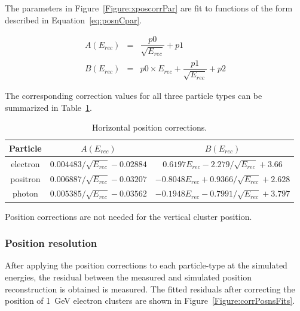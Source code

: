 The parameters in Figure~\ref{Figure:xposcorrPar} are fit to functions of the form described in Equation~\eqref{eq:posnCpar}.

\begin{eqnarray*}
\label{eq:posnCpar}
A(E_{rec}) & = & \dfrac{p0}{\sqrt{E_{rec}}}+p1\\
B(E_{rec}) & = & p0\times E_{rec} +\dfrac{p1}{\sqrt{E_{rec}}}+p2
\end{eqnarray*}

The corresponding correction values for all three particle types can be summarized in Table~\ref{tab:horizPosCorr}.

\begin{table}[H]
\caption{Horizontal position corrections.}
\label{tab:horizPosCorr}
\centering
\begin{tabular}{|c|c|c|}
\toprule
Particle & $A(E_{rec})$ & $B(E_{rec})$ \\
\midrule
electron & $0.004483/\sqrt{E_{rec}}-0.02884$ & $0.6197E_{rec}-2.279/\sqrt{E_{rec}}+3.66$ \\
positron & $0.006887/\sqrt{E_{rec}}-0.03207$ & $-0.8048E_{rec}+0.9366/\sqrt{E_{rec}}+2.628$ \\
photon & $0.005385/\sqrt{E_{rec}}-0.03562$ & $-0.1948E_{rec}-0.7991/\sqrt{E_{rec}}+3.797$ \\
\bottomrule
\end{tabular}
\end{table}

Position corrections are not needed for the vertical cluster position.

\subsubsection{Position resolution}

After applying the position corrections to each particle-type at the simulated energies, the residual between the measured and simulated position reconstruction is obtained is measured. The fitted residuals after correcting the position of 1~GeV electron clusters are shown in Figure~\ref{Figure:corrPosnsFits}.

